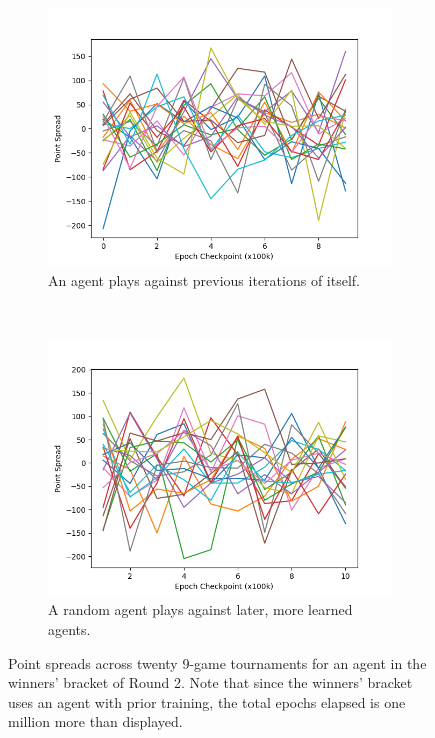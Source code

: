 
\begin{figure}
\center

\begin{subfigure}[b]{0.45\textwidth}
	\includegraphics[width=\linewidth]{images/findings/round2/spreads_self-v-prev_winner.png}
	\caption{An agent plays against previous iterations of itself.}
	\label{fig:r2-spreads-winner-a}
\end{subfigure}
~
\begin{subfigure}[b]{0.45\textwidth}
	\includegraphics[width=\linewidth]{images/findings/round2/spreads_rand-v-fut_winner.png}
	\caption{A random agent plays against later, more learned agents.}
	\label{fig:r2-spreads-winner-b}
\end{subfigure}

\caption{
	Point spreads across twenty 9-game tournaments for an agent in the
	winners' bracket of Round 2.
	Note that since the winners' bracket uses an agent with prior training,
	the total epochs elapsed is one million more than displayed.
}
\label{fig:r2-spreads-winner}
\end{figure}
